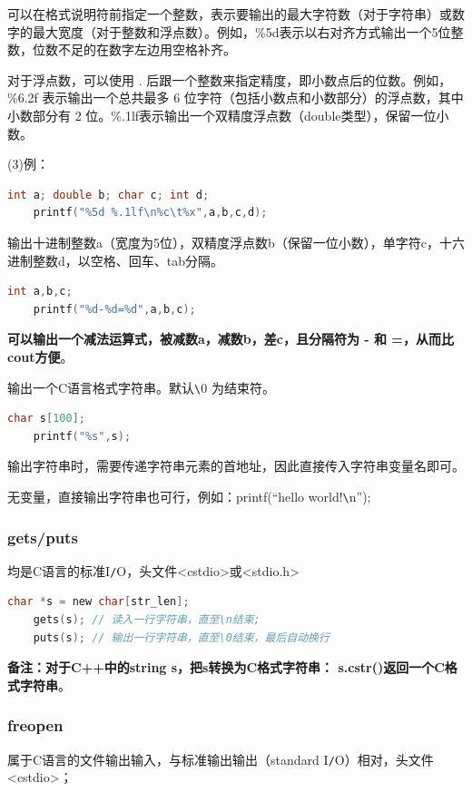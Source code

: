 \documentclass[UTF8]{ctexart}
\begin{document}
可以在格式说明符前指定一个整数，表示要输出的最大字符数（对于字符串）或数字的最大宽度（对于整数和浮点数）。例如，\%5d表示以右对齐方式输出一个5位整数，位数不足的在数字左边用空格补齐。

对于浮点数，可以使用 . 后跟一个整数来指定精度，即小数点后的位数。例如，\%6.2f 表示输出一个总共最多 6 位字符（包括小数点和小数部分）的浮点数，其中小数部分有 2 位。\%.1lf表示输出一个双精度浮点数（double类型），保留一位小数。

(3)例：
\begin{lstlisting}[language = C,basicstyle=\small\ttfamily]
    int a; double b; char c; int d;
    printf("%5d %.1lf\n%c\t%x",a,b,c,d);
\end{lstlisting}
输出十进制整数a（宽度为5位），双精度浮点数b（保留一位小数），单字符c，十六进制整数d，以空格、回车、tab分隔。
\begin{lstlisting}[language = C,basicstyle=\small\ttfamily]
    int a,b,c;
    printf("%d-%d=%d",a,b,c);
\end{lstlisting}
\textbf{可以输出一个减法运算式，被减数a，减数b，差c，且分隔符为 - 和 =，从而比cout方便}。

输出一个C语言格式字符串。默认\verb|\|0 为结束符。
\begin{lstlisting}[language = C,basicstyle=\small\ttfamily]
    char s[100];
    printf("%s",s); 
\end{lstlisting}
输出字符串时，需要传递字符串元素的首地址，因此直接传入字符串变量名即可。

无变量，直接输出字符串也可行，例如：printf(“hello world!\verb|\|n”);

\subsubsection{gets/puts}
均是C语言的标准I\verb|/|O，头文件<cstdio>或<stdio.h>
\begin{lstlisting}[language = C,basicstyle=\small\ttfamily]
    char *s = new char[str_len];
    gets(s); // 读入一行字符串，直至\n结束;
    puts(s); // 输出一行字符串，直至\0结束，最后自动换行
\end{lstlisting}
 \textbf{备注：对于C++中的string s，把s转换为C格式字符串： s.c\textunderscore str()返回一个C格式字符串}。

 \subsubsection{freopen}
 属于C语言的文件输出输入，与标准输出输出（standard I\verb|/|O）相对，头文件<cstdio>；
 
\end{document}
